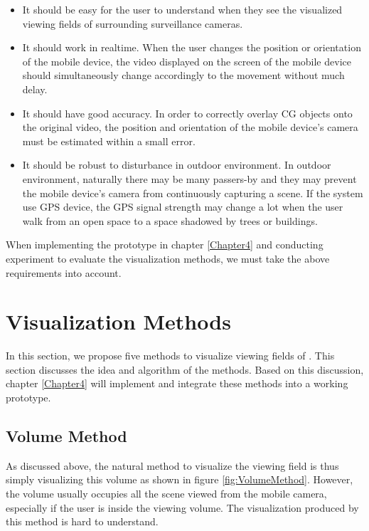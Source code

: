 \begin{itemize}
	\item It should be easy for the user to understand when they see the visualized viewing fields of surrounding surveillance cameras.
	\item It should work in realtime. When the user changes the position or orientation of the mobile device, the video displayed on the screen of the mobile device should simultaneously change accordingly to the movement without much delay.
	\item It should have good accuracy. In order to correctly overlay CG objects onto the original video, the position and orientation of the mobile device's camera must be estimated within a small error.
	\item It should be robust to disturbance in outdoor environment. In outdoor environment, naturally there may be many passers-by and they may prevent the mobile device's camera from continuously capturing a scene. If the system use GPS device, the GPS signal strength may change a lot when the user walk from an open space to a space shadowed by trees or buildings.
\end{itemize}

When implementing the prototype in chapter \ref{Chapter4} and conducting experiment to evaluate the visualization methods, we must take the above requirements into account.

\section{Visualization Methods}
\label{VisualizationMethods}

In this section, we propose five methods to visualize viewing fields of . This section discusses the idea and algorithm of the methods. Based on this discussion, chapter \ref{Chapter4} will implement and integrate these methods into a working prototype.

\subsection{Volume Method}

As discussed above, the natural method to visualize the viewing field is thus simply visualizing this volume as shown in figure \ref{fig:VolumeMethod}. However, the volume usually occupies all the scene viewed from the mobile camera, especially if the user is inside the viewing volume. The visualization produced by this method is hard to understand.

